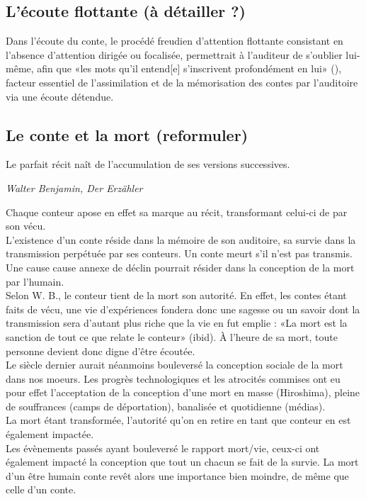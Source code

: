 
\subsection{L'écoute flottante (à détailler ?)}
Dans l'écoute du conte, le procédé freudien d'attention flottante consistant en l'absence d'attention dirigée ou focalisée, permettrait à l'auditeur de s'oublier lui-même, afin que «les mots qu'il entend[e] s'inscrivent profondément en lui» (\cite{benjamin1991gesammelte}), facteur essentiel de l'assimilation et de la mémorisation des contes par l'auditoire via une écoute détendue.\\

\subsection{Le conte et la mort (reformuler)}

\begin{shadequote}
Le parfait récit naît de l'accumulation de ses versions successives. \par\emph{Walter Benjamin, Der Erzähler}
\end{shadequote}

Chaque conteur apose en effet sa marque au récit, transformant celui-ci de par son vécu.\\
L'existence d'un conte réside dans la mémoire de son auditoire, sa survie dans la transmission perpétuée par ses conteurs. Un conte meurt s'il n'est pas transmis.\\
Une cause cause annexe de déclin pourrait résider dans la conception de la mort par l'humain.\\
Selon W. B., le conteur tient de la mort son autorité. En effet, les contes étant faits de vécu, une vie d'expériences fondera donc une sagesse ou un savoir dont la transmission sera d'autant plus riche que la vie en fut emplie :  «La mort est la sanction de tout ce que relate le conteur» (ibid). À l'heure de sa mort, toute personne devient donc digne d'être écoutée.\\

Le siècle dernier aurait néanmoins bouleversé la conception sociale de la mort dans nos moeurs. Les progrès technologiques et les atrocités commises ont eu pour effet l'acceptation de la conception d'une mort en masse (Hiroshima), pleine de souffrances (camps de déportation), banalisée et quotidienne (médias).\\
La mort étant transformée, l'autorité qu'on en retire en tant que conteur en est également impactée.\\
Les évènements passés ayant bouleversé le rapport mort/vie, ceux-ci ont également impacté la conception que tout un chacun se fait de la survie. La mort d'un être humain conte revêt alors une importance bien moindre, de même que celle d'un conte.

\clearpage
